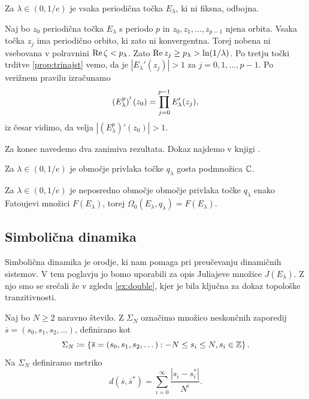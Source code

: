 \begin{posledica}
    Za \(\lambda \in (0, 1/e)\) je vsaka periodična točka \(E_\lambda\), ki ni fiksna, odbojna.
\end{posledica}

\begin{dokaz}
    Naj bo \(z_0\) periodična točka \(E_\lambda\) s periodo \(p\) in \(z_0, z_1, \dots, z_{p - 1}\) njena orbita. Vsaka točka \(z_j\) ima periodično orbito, ki zato ni konvergentna. Torej nobena ni vsebovana v polravnini \(\operatorname{Re} \zeta < p_\lambda\). Zato \(\operatorname{Re} z_j \geq p_\lambda > \ln (1 / \lambda)\). Po tretju točki trditve \ref{prop:trinajst} vemo, da je \(|E_\lambda' (z_j)| > 1\) za \(j = 0, 1, \dots, p - 1\). Po verižnem pravilu izračunamo
    \[\left( E_\lambda^p \right)' (z_0) = \prod_{j = 0}^{p - 1} E_\lambda' (z_j),\]
    iz česar vidimo, da velja \(|(E_\lambda^p)' (z_0)| > 1\).
\end{dokaz}

Za konec navedemo dva zanimiva rezultata. Dokaz najdemo v knjigi \cite[trditev 9.1.7, izrek 9.1.8]{Pineiro_2025}.

\begin{trditev}
    Za \(\lambda \in (0, 1/e)\) je območje privlaka točke \(q_\lambda\) gosta podmnožica \(\mathbb C\).
\end{trditev}

\begin{izrek}
    Za \(\lambda \in (0, 1/e)\) je neposredno območje območje privlaka točke \(q_\lambda\) enako Fatoujevi množici \(F (E_\lambda)\), torej \(\Omega_0 (E_\lambda, q_\lambda) = F (E_\lambda)\).
\end{izrek}

\subsection{Simbolična dinamika}

Simbolična dinamika je orodje, ki nam pomaga pri preučevanju dinamičnih sistemov. V tem poglavju jo bomo uporabili za opis Juliajeve množice \(J (E_\lambda)\). Z njo smo se srečali že v zgledu \ref{ex:double}, kjer je bila ključna za dokaz topološke tranzitivnosti.

Naj bo \(N \geq 2\) naravno število. Z \(\Sigma_N\) označimo množico neskončnih zaporedij \(\overline{s} = (s_0, s_1, s_2, \dots)\), definirano kot
\[\Sigma_N \coloneq \left\{ \overline{s} = (s_0, s_1, s_2, \dots) : - N \leq s_i \leq N, s_i \in \mathbb Z \right\}.\]
Na \(\Sigma_N\) definiramo metriko
\[d (\overline{s}, \overline{s}^*) = \sum_{i = 0}^{\infty} \frac{|s_i - s_i^*|}{N^i}.\]

